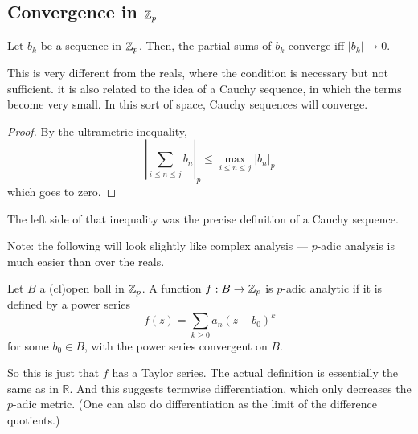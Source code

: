 \subsection{Convergence in $\mathbb{Z}_p$}
\begin{lem}
Let $b_k$ be a sequence in $\mathbb{Z}_p$. Then, the partial sums of $b_k$ converge iff $|b_k|\to 0$.
\end{lem}
This is very different from the reals, where the condition is necessary but not sufficient. it is also related to the idea of a Cauchy sequence, in which the terms become very small. In this sort of space, Cauchy sequences will converge.
\begin{proof}
By the ultrametric inequality,
\[\left|\sum_{i \le n \le j} b_n\right|_p \le \max_{i \le n \le j} |b_n|_p\]
which goes to zero.
\end{proof}
The left side of that inequality was the precise definition of a Cauchy sequence.

Note: the following will look slightly like complex analysis --- $p$-adic analysis is much easier than over the reals.
\begin{defn}
Let $B$ a (cl)open ball in $\mathbb{Z}_p$. A function $f:B\to\mathbb{Z}_p$ is $p$-adic analytic if it is defined by a power series
\[f(z) = \sum_{k \ge 0} a_n (z-b_0)^k\]
for some $b_0\in B$, with the power series convergent on $B$.
\end{defn}
So this is just that $f$ has a Taylor series. The actual definition is essentially the same as in $\mathbb{R}$. And this suggests termwise differentiation, which only decreases the $p$-adic metric. (One can also do differentiation as the limit of the difference quotients.)

